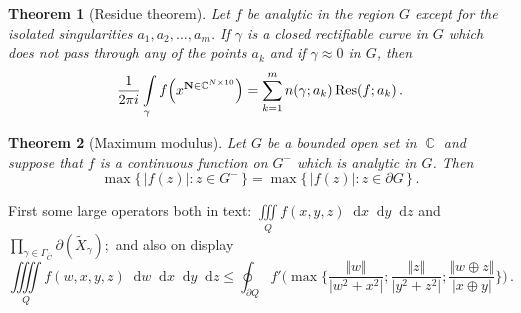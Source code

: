 \documentclass[crop=false,preview=false]{standalone}
\DeclareMathOperator\Res{Res}
\newcommand*\diff{\mathop{}\!\mathup{d}}
\newtheorem{theorem}{Theorem}
\begin{document}
\noindent
\begin{minipage}[c][\textheight][c]{\textwidth}
\centering
\begin{minipage}{12cm}
\begin{theorem}[Residue theorem]
  Let $f$ be analytic in the region $G$ except for the isolated
  singularities $a_1,a_2,\dots,a_m$. If $\gamma$ is a closed
  rectifiable curve in $G$ which does not pass through any of the
  points $a_k$ and if $\gamma\approx 0$ in $G$, then
  \[
    \frac{1}{2\pi i} \int\limits_\gamma f\Bigl(x^{\mathbf{N}\in\mathbb{C}^{N\times 10}}\Bigr)
    = \sum_{k=1}^m n(\gamma;a_k)\Res(f;a_k)\,.
  \]
\end{theorem}

\begin{theorem}[Maximum modulus]
  Let $G$ be a bounded open set in $\BbbC$ and suppose that $f$ is a
  continuous function on $G^-$ which is analytic in $G$. Then
  \[
    \max\{\, |f(z)|:z\in G^- \,\} = \max\{\, |f(z)|:z\in \partial G \,\}\,.
  \]
\end{theorem}

First some large operators both in text:
$\iiint\limits_{Q}f(x,y,z) \diff x \diff y \diff z$
and
$\prod_{\gamma\in\Gamma_{\bar{C}}}\partial(\tilde{X}_\gamma)$;\
and also on display
\[
  \iiiint\limits_{Q}f(w,x,y,z) \diff w \diff x \diff y \diff z
  \leq
  \oint_{\partial Q} f'\Biggl(\max\Biggl\{
  \frac{\Vert w\Vert}{\vert w^2+x^2\vert};
  \frac{\Vert z\Vert}{\vert y^2+z^2\vert};
  \frac{\Vert w\oplus z\Vert}{\vert x\oplus y\vert}
  \Biggr\}\Biggr)\,.
\]
\end{minipage}
\end{minipage}
\end{document}

